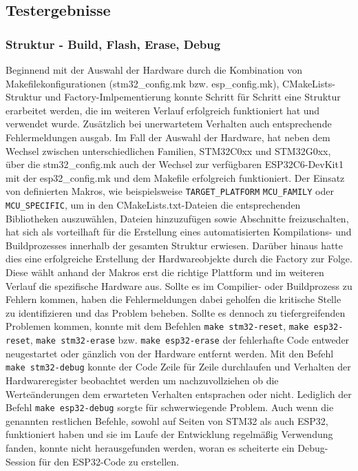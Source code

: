 \subsection{Testergebnisse}
\subsubsection{Struktur - Build, Flash, Erase, Debug}
Beginnend mit der Auswahl der Hardware durch die Kombination von Makefilekonfigurationen (stm32\_config.mk bzw. esp\_config.mk), CMakeLists-Struktur und Factory-Imlpementierung konnte Schritt für Schritt eine Struktur erarbeitet werden, die im weiteren Verlauf erfolgreich funktioniert hat und verwendet wurde.
Zusätzlich bei unerwartetem Verhalten auch entsprechende Fehlermeldungen ausgab.
Im Fall der Auswahl der Hardware, hat neben dem Wechsel zwischen unterschiedlichen Familien, STM32C0xx und STM32G0xx, über die stm32\_config.mk auch der Wechsel zur verfügbaren ESP32C6-DevKit1 mit der esp32\_config.mk und dem Makefile erfolgreich funktioniert.
Der Einsatz von definierten Makros, wie beispielsweise \texttt{TARGET\_PLATFORM} \texttt{MCU\_FAMILY} oder \texttt{MCU\_SPECIFIC}, um in den CMakeLists.txt-Dateien die entsprechenden Bibliotheken auszuwählen, Dateien hinzuzufügen sowie Abschnitte freizuschalten, hat sich als vorteilhaft für die Erstellung eines automatisierten Kompilations- und Buildprozesses innerhalb der gesamten Struktur erwiesen.
Darüber hinaus hatte dies eine erfolgreiche Erstellung der Hardwareobjekte durch die Factory zur Folge.
Diese wählt anhand der Makros erst die richtige Plattform und im weiteren Verlauf die spezifische Hardware aus.
Sollte es im Compilier- oder Buildprozess zu Fehlern kommen, haben die Fehlermeldungen dabei geholfen die kritische Stelle zu identifizieren und das Problem beheben.
Sollte es dennoch zu tiefergreifenden Problemen kommen, konnte mit dem Befehlen \texttt{make stm32-reset}, \texttt{make esp32-reset}, \texttt{make stm32-erase} bzw. \texttt{make esp32-erase} der fehlerhafte Code entweder neugestartet oder gänzlich von der Hardware entfernt werden.
Mit den Befehl \texttt{make stm32-debug} konnte der Code Zeile für Zeile durchlaufen und Verhalten der Hardwareregister beobachtet werden um nachzuvollziehen ob die Werteänderungen dem erwarteten Verhalten entsprachen oder nicht.
Lediglich der Befehl \texttt{make esp32-debug} sorgte für schwerwiegende Problem. 
Auch wenn die genannten restlichen Befehle, sowohl auf Seiten von STM32 als auch ESP32, funktioniert haben und sie im Laufe der Entwicklung regelmäßig Verwendung fanden, konnte nicht herausgefunden werden, woran es scheiterte ein Debug-Session für den ESP32-Code zu erstellen.

